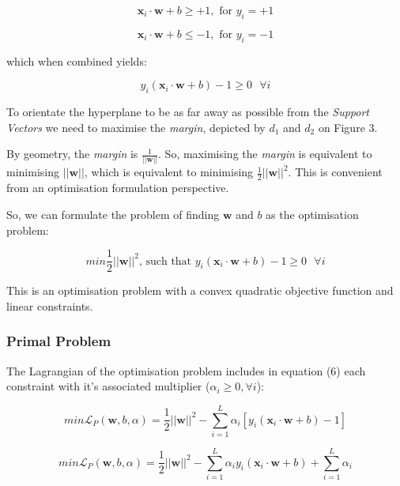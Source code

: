 \documentclass[10pt, a4paper,reqno]{amsart}
\begin{document}
\begin{equation}
\mathbf{x}_i\cdot\mathbf{w} + b \geq +1,\text{ for }y_i = +1
\end{equation}

\begin{equation}
\mathbf{x}_i\cdot\mathbf{w} + b \leq -1,\text{ for }y_i = -1
\end{equation}

which when combined yields:

\begin{equation}
y_i(\mathbf{x}_i\cdot\mathbf{w} + b) - 1 \geq 0\text{ }\forall{i}
\end{equation}

To orientate the hyperplane to be as far away as possible from the \emph{Support Vectors} we need to maximise the \emph{margin}, depicted by $d_1$ and $d_2$ on Figure 3.

By geometry, the \emph{margin} is $\frac{1}{||\mathbf{w}||}$. So, maximising the \emph{margin} is equivalent to minimising $||\mathbf{w}||$, which is equivalent to minimising $\frac{1}{2}||\mathbf{w}||^2$. This is convenient from an optimisation formulation perspective.

So, we can formulate the problem of finding $\mathbf{w}$ and $b$ as the optimisation problem:

\begin{equation}
min\frac{1}{2}||\mathbf{w}||^2\text{, such that }y_i(\mathbf{x}_i\cdot\mathbf{w} + b) - 1 \geq 0\text{ }\forall{i}
\end{equation}

This is an optimisation problem with a convex quadratic objective function and linear constraints.

\subsubsection{Primal Problem}

The Lagrangian of the optimisation problem includes in equation (6) each constraint with it's associated multiplier ($\alpha_i \geq 0, \forall i$):

\begin{equation}
min\mathcal{L}_P(\mathbf{w}, b, \alpha) = \frac{1}{2}||\mathbf{w}||^2 - \sum_{i=1}^{L}\alpha_i[y_i(\mathbf{x}_i\cdot\mathbf{w} + b) - 1]
\end{equation}

\begin{equation}
min\mathcal{L}_P(\mathbf{w}, b, \alpha) = \frac{1}{2}||\mathbf{w}||^2 - \sum_{i=1}^{L}\alpha_i y_i(\mathbf{x}_i\cdot\mathbf{w} + b) + \sum_{i=1}^{L}\alpha_i
\end{equation}
\end{document}
